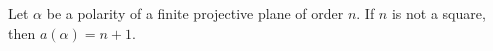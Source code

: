 Let $\alpha$ be a polarity of a finite projective plane of order $n$. If $n$ is not a square, then $a(\alpha) = n+1$.
